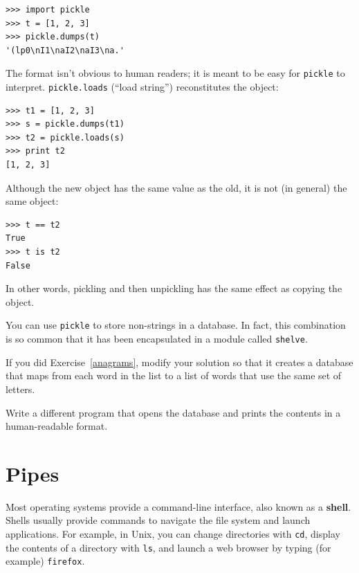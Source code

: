\documentclass[10pt]{book}
\begin{document}
\beforeverb
\begin{verbatim}
>>> import pickle
>>> t = [1, 2, 3]
>>> pickle.dumps(t)
'(lp0\nI1\naI2\naI3\na.'
\end{verbatim}
\afterverb
%
The format isn't obvious to human readers; it is meant to be
easy for {\tt pickle} to interpret.  {\tt pickle.loads}
(``load string'') reconstitutes the object:

\beforeverb
\begin{verbatim}
>>> t1 = [1, 2, 3]
>>> s = pickle.dumps(t1)
>>> t2 = pickle.loads(s)
>>> print t2
[1, 2, 3]
\end{verbatim}
\afterverb
%
Although the new object has the same value as the old, it is
not (in general) the same object:

\beforeverb
\begin{verbatim}
>>> t == t2
True
>>> t is t2
False
\end{verbatim}
\afterverb
%
In other words, pickling and then unpickling has the same effect
as copying the object.

You can use {\tt pickle} to store non-strings in a database.
In fact, this combination is so common that it has been
encapsulated in a module called {\tt shelve}.  



\begin{ex}


If you did Exercise~\ref{anagrams}, modify your solution so that
it creates a database that maps from each word in the list to
a list of words that use the same set of letters.

Write a different program that opens the database and prints
the contents in a human-readable format.
\end{ex}


\section{Pipes}


Most operating systems provide a command-line interface,
also known as a {\bf shell}.  Shells usually provide commands
to navigate the file system and launch applications.  For
example, in Unix, you can change directories with {\tt cd},
display the contents of a directory with {\tt ls}, and launch
a web browser by typing (for example) {\tt firefox}.
\end{document}
